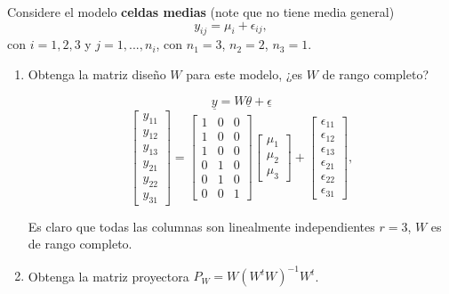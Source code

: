\documentclass[12pt,a4paper]{report}
\begin{document}
\begin{enumerate}
Considere el modelo \textbf{celdas medias} (note que no tiene media general)
\[y_{ij} = \mu_i + \epsilon_{ij},\]
con $i = 1, 2, 3$ y $j = 1, ..., n_i$, con $n_1 = 3$, $n_2 = 2$, $n_3 = 1$.


\begin{enumerate}


\item[1.] Obtenga la matriz diseño $W$ para este modelo, ¿es $W$ de rango completo?

$$\underline{y}=W\underline{\theta}+\underline{\epsilon}$$
\[\begin{bmatrix}
y_{11} \\ y_{12} \\ y_{13} \\ y_{21} \\ y_{22} \\ y_{31}
\end{bmatrix} =
\begin{bmatrix}
1 & 0 & 0 \\
1 & 0 & 0 \\
1 & 0 & 0 \\
0 & 1 & 0 \\
0 & 1 & 0 \\
0 & 0 & 1
\end{bmatrix}
\begin{bmatrix}
\mu_1 \\ \mu_2 \\ \mu_3
\end{bmatrix} + 
\begin{bmatrix}
\epsilon_{11} \\ \epsilon_{12} \\ \epsilon_{13} \\ \epsilon_{21} \\ \epsilon_{22} \\ \epsilon_{31}
\end{bmatrix},
\]


Es claro que todas las columnas son linealmente independientes
$r=3$, $W$ es de rango completo.



\item[2.] Obtenga la matriz proyectora $P_W = W(W^tW)^{-1}W^t$.



\end{enumerate}
\end{enumerate}
\end{document}
